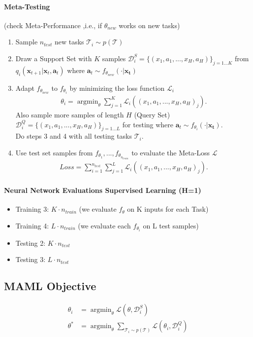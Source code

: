 \documentclass{article}
\DeclareMathOperator*{\argmin}{argmin}
\begin{document}
\paragraph{Meta-Testing} (check Meta-Performance ,i.e., if $\theta_{new}$ works on new tasks)
	\begin{enumerate}
		\item Sample $n_{test}$ new tasks $\mathcal{T}_i \sim p(\mathcal{T})$
		\item Draw a Support Set with $K$ samples $\mathcal{D}_i^{S} = \{(x_1, a_1, ..., x_H, a_H)\}_{j=1...K}$ from $q_i(\boldsymbol{x}_{t+1} \vert \boldsymbol{x}_t, \boldsymbol{a}_t)$ where $\boldsymbol{a}_t \sim f_{\theta_{new}}( \cdot \vert \boldsymbol{x_t})$
		\item Adapt $f_{\theta_{new}}$ to $f_{\theta_i}$ by minimizing the loss function $\mathcal{L}_i$
		\begin{align}
			\theta_i = \argmin_{\theta} \sum_{j=1}^{K} \mathcal{L}_i((x_1, a_1, ..., x_H, a_H)_j).
		\end{align}
		Also sample more samples of length $H$ (Query Set) $\mathcal{D}_i^{Q}=\{(x_1, a_1, ..., x_H, a_H)\}_{j=1...L}$ for testing where $\boldsymbol{a}_t \sim f_{\theta_i}( \cdot \vert \boldsymbol{x_t})$.\\
		Do steps 3 and 4 with all testing tasks $\mathcal{T}_i$.
		\item Use test set samples from $f_{\theta_1}, ..., f_{\theta_{n_{train}}}$ to evaluate the Meta-Loss $\mathcal{L}$
		\begin{align}
			Loss = \sum_{i=1}^{n_{test}} \sum_{j=1}^{L} \mathcal{L}_i((x_1, a_1, ..., x_H, a_H)_j).
		\end{align}
	\end{enumerate}
\paragraph{Neural Network Evaluations Supervised Learning (H=1)}
	\begin{itemize}
		\item Training 3: $K \cdot n_{train}$  (we evaluate $f_{\theta}$ on K inputs for each Task)
		\item Training 4:  $L \cdot n_{train}$ (we evaluate each $f_{\theta_i}$ on L test samples)
		\item Testing 2: $K \cdot n_{test}$ 
		\item Testing 3: $L \cdot n_{test}$
	\end{itemize}

\subsection{MAML Objective}
\begin{align*}
	\theta_i &= \argmin_{\theta} \mathcal{L}(\theta, \mathcal{D}_i^{S})\\
	\theta^* &= \argmin_{\theta} \sum_{\mathcal{T}_i \sim p(\mathcal{T})} \mathcal{L}(\theta_i, \mathcal{D}_i^{Q})
\end{align*}
\end{document}
